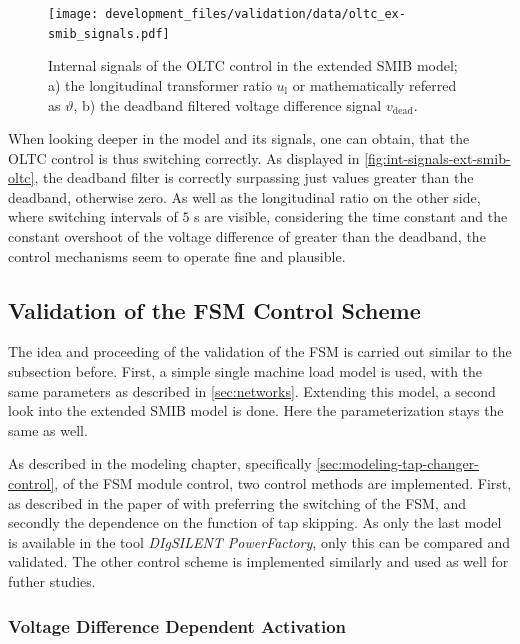 \begin{figure}[htbp!]
    \centering
    \texttt{[image: development\_files/validation/data/oltc\_ex-smib\_signals.pdf]}
    \caption[Internal signals of the \acs{OLTC} control in the extended \acs{SMIB} model]{Internal signals of the \acs{OLTC} control in the extended \acs{SMIB} model; a) the longitudinal transformer ratio $u_\mathrm{l}$ or mathematically referred as $\vartheta$, b) the deadband filtered voltage difference signal $v_\mathrm{dead}$.}
    \label{fig:int-signals-ext-smib-oltc}
\end{figure}

When looking deeper in the model and its signals, one can obtain, that the \acs{OLTC} control is thus switching correctly.
As displayed in \autoref{fig:int-signals-ext-smib-oltc}, the deadband filter is correctly surpassing just values greater than the deadband, otherwise zero.
As well as the longitudinal ratio on the other side, where switching intervals of $5$ s are visible, considering the time constant and the constant overshoot of the voltage difference of greater than the deadband, the control mechanisms seem to operate fine and plausible.

\subsection{Validation of the FSM Control Scheme}
\label{sec:validation-fsm-schemes}

The idea and proceeding of the validation of the \acs{FSM} is carried out similar to the subsection before.
First, a simple single machine load model is used, with the same parameters as described in \autoref{sec:networks}.
Extending this model, a second look into the extended \acs{SMIB} model is done.
Here the parameterization stays the same as well.

As described in the modeling chapter, specifically \autoref{sec:modeling-tap-changer-control}, of the \acs{FSM} module control, two control methods are implemented.
First, as described in the paper of \textcite{burlakin_2024} with preferring the switching of the \acs{FSM}, and secondly the dependence on the function of tap skipping.
As only the last model is available in the tool \textit{DIgSILENT PowerFactory}, only this can be compared and validated. 
The other control scheme is implemented similarly and used as well for futher studies.

\subsubsection{Voltage Difference Dependent Activation}

